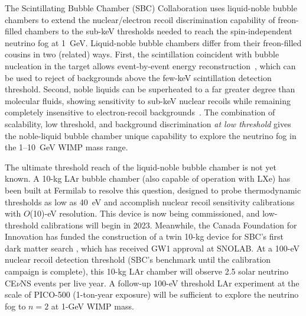 
The Scintillating Bubble Chamber (SBC) Collaboration uses liquid-noble bubble chambers to extend the nuclear/electron recoil discrimination capability of freon-filled chambers to the sub-keV thresholds needed to reach the spin-independent neutrino fog at 1~GeV.  Liquid-noble bubble chambers differ from their freon-filled cousins in two (related) ways. First, the scintillation coincident with bubble nucleation in the target allows event-by-event energy reconstruction~\cite{Baxter:2017ozv}, which can be used to reject of backgrounds above the few-keV scintillation detection threshold.  Second, noble liquids can be superheated to a far greater degree than molecular fluids, showing sensitivity to sub-keV nuclear recoils while remaining completely insensitive to electron-recoil backgrounds~\cite{Durnford:2021cvb}.  The combination of scalability, low threshold, and background discrimination \emph{at low threshold} gives the noble-liquid bubble chamber unique capability to explore the neutrino fog in the 1--10~GeV WIMP mass range.

The ultimate threshold reach of the liquid-noble bubble chamber is not yet known.  A 10-kg LAr bubble chamber (also capable of operation with LXe) has been built at Fermilab to resolve this question, designed to probe thermodynamic thresholds as low as 40~eV and accomplish nuclear recoil sensitivity calibrations with $O$(10)-eV resolution.  This device is now being commissioned, and low-threshold calibrations will begin in 2023.  Meanwhile, the Canada Foundation for Innovation has funded the construction of a twin 10-kg device for SBC's first dark matter search \cite{Giampa:2021wte}, which has received GW1 approval at SNOLAB.  At a 100-eV nuclear recoil detection threshold (SBC's benchmark until the calibration campaign is complete), this 10-kg LAr chamber will observe 2.5 solar neutrino CE$\nu$NS events per live year.  A follow-up 100-eV threshold LAr experiment at the scale of PICO-500 (1-ton-year exposure) will be sufficient to explore the neutrino fog to $n=2$ at 1-GeV WIMP mass.